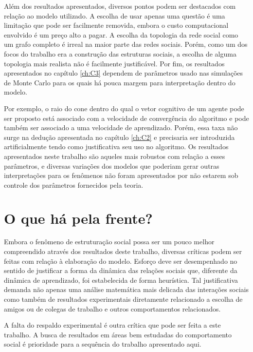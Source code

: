 Além dos resultados apresentados, diversos pontos podem ser destacados com relação ao modelo utilizado.
A escolha de usar apenas uma questão é uma limitação que pode ser facilmente removida, embora o custo computacional envolvido é um preço alto a pagar.
A escolha da topologia da rede social como um grafo completo é irreal na maior parte das redes sociais.
Porém, como um dos focos do trabalho era a construção das estruturas sociais, a escolha de alguma topologia mais realista não é facilmente justificável.
Por fim, os resultados apresentados no capítulo \ref{ch:C3} dependem de parâmetros usado nas simulações de Monte Carlo para os quais há pouca margem para interpretação dentro do modelo.

Por exemplo, o raio do cone dentro do qual o vetor cognitivo de um agente pode ser proposto está associado com a velocidade de convergência do algoritmo e pode também ser associado a uma velocidade de aprendizado.
Porém, essa taxa não surge na dedução apresentada no capítulo \ref{ch:C2} e precisaria ser introduzida artificialmente tendo como justificativa seu uso no algoritmo.
Os resultados apresentados neste trabalho são aqueles mais robustos com relação a esses parâmetros, e diversas variações dos modelos que poderiam gerar outras interpretações para os fenômenos não foram apresentados por não estarem sob controle dos parâmetros fornecidos pela teoria.

\section{O que há pela frente?}

Embora o fenômeno de estruturação social possa ser um pouco melhor compreendido através dos resultados deste trabalho, diversas críticas podem ser feitas com relação à elaboração do modelo.
Esforço deve ser desempenhado no sentido de justificar a forma da dinâmica das relações sociais que, diferente da dinâmica de aprendizado, foi estabelecida de forma heurística.
Tal justificativa demanda não apenas uma análise matemática mais delicada das interações sociais como também de resultados experimentais diretamente relacionado a escolha de amigos ou de colegas de trabalho e outros comportamentos relacionados.

A falta do respaldo experimental é outra crítica que pode ser feita a este trabalho.
A busca de resultados em áreas bem estudadas do comportamento social é prioridade para a sequência do trabalho apresentado aqui.

